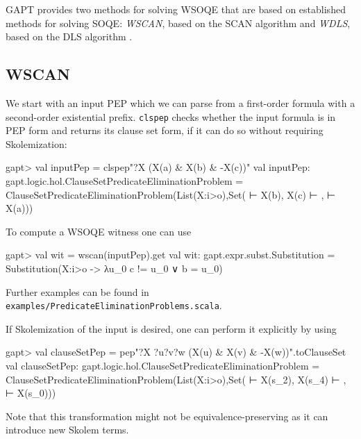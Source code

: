 \documentclass[a4paper,11pt]{book}
\begin{document}
GAPT provides two methods for solving WSOQE that are based on established methods for solving SOQE: \emph{WSCAN}, based on the SCAN algorithm \cite{Gabbay1992Quantifier} and \emph{WDLS}, based on the DLS algorithm \cite{Doherty1997Computing}.

\subsection{WSCAN}

We start with an input PEP which we can parse from a first-order formula with a second-order existential prefix. \texttt{clspep} checks whether the input formula is in PEP form and returns its clause set form, if it can do so without requiring Skolemization:
\begin{clilisting}
gapt> val inputPep = clspep"?X (X(a) & X(b) & -X(c))"
val inputPep: gapt.logic.hol.ClauseSetPredicateEliminationProblem = ClauseSetPredicateEliminationProblem(List(X:i>o),Set( ⊢ X(b), X(c) ⊢ ,  ⊢ X(a)))

\end{clilisting}

To compute a WSOQE witness one can use
\begin{clilisting}
gapt> val wit = wscan(inputPep).get
val wit: gapt.expr.subst.Substitution = Substitution(X:i>o -> λu_0 c != u_0 ∨ b = u_0)

\end{clilisting}

Further examples can be found in \texttt{examples/PredicateEliminationProblems.scala}.

If Skolemization of the input is desired, one can perform it explicitly by using
\begin{clilisting}
gapt> val clauseSetPep = pep"?X ?u?v?w (X(u) & X(v) & -X(w))".toClauseSet
val clauseSetPep: gapt.logic.hol.ClauseSetPredicateEliminationProblem = ClauseSetPredicateEliminationProblem(List(X:i>o),Set( ⊢ X(s_2), X(s_4) ⊢ ,  ⊢ X(s_0)))

\end{clilisting}
Note that this transformation might not be equivalence-preserving as it can introduce new Skolem terms.
\end{document}
